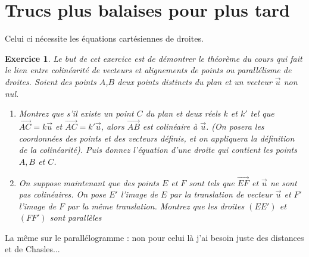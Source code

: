 \documentclass[10pt,a4paper]{article}
\newtheorem{exo}{Exercice}
\begin{document}
\newpage

\section{Trucs plus balaises pour plus tard}


Celui ci nécessite les équations cartésiennes de droites.
\begin{exo}
    Le but de cet exercice est de démontrer le théorème du cours qui fait le lien entre colinéarité de vecteurs et alignements de points ou parallélisme de droites. Soient des points $A$,$B$ deux points distincts du plan et un vecteur $\overrightarrow{u}$ non nul.
    \begin{enumerate}
        \item Montrez que s'il existe un point $C$ du plan et deux réels $k$ et $k'$ tel que $\overrightarrow{AC}=k\overrightarrow{u}$ et $\overrightarrow{AC}=k'\overrightarrow{u}$, alors $\overrightarrow{AB}$ est colinéaire à $\overrightarrow{u}$.  (On posera les coordonnées des points et des vecteurs définis, et on appliquera la définition de la colinéarité). Puis donnez l'équation d'une droite qui contient les points $A, B$ et $C$.
        \item On suppose maintenant que des points $E$ et $F$ sont tels que $\overrightarrow{EF}$ et $\overrightarrow{u}$ ne sont pas colinéaires. On pose $E'$ l'image de $E$ par la translation de vecteur $\overrightarrow{u}$ et $F'$ l'image de $F$ par la même translation.  Montrez que les droites $(EE')$ et $(FF')$ sont parallèles 
    \end{enumerate}
\end{exo}

La même sur le parallélogramme : non pour celui là j'ai besoin juste des distances et de Chasles...
\end{document}
